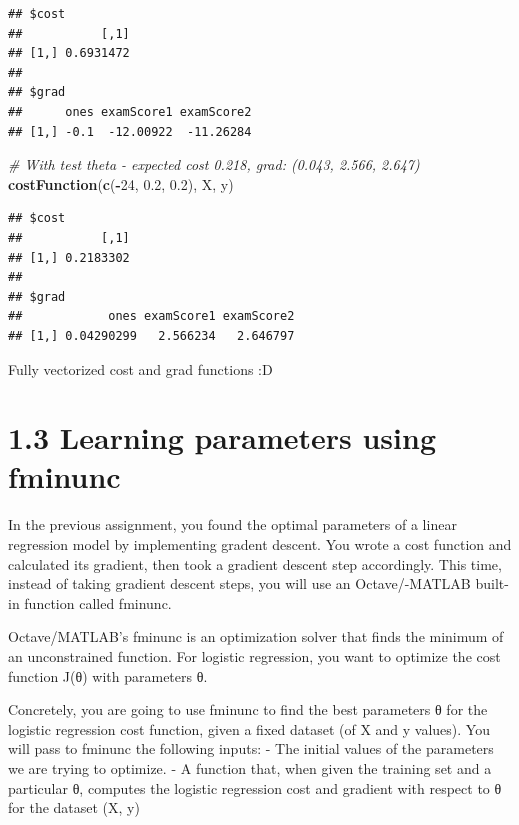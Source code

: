 \documentclass[
]{book}
\newenvironment{Shaded}{\begin{snugshade}}{\end{snugshade}}
\newcommand{\CommentTok}[1]{\textcolor[rgb]{0.56,0.35,0.01}{\textit{#1}}}
\newcommand{\DecValTok}[1]{\textcolor[rgb]{0.00,0.00,0.81}{#1}}
\newcommand{\FloatTok}[1]{\textcolor[rgb]{0.00,0.00,0.81}{#1}}
\newcommand{\KeywordTok}[1]{\textcolor[rgb]{0.13,0.29,0.53}{\textbf{#1}}}
\newcommand{\NormalTok}[1]{#1}
\newcommand{\OperatorTok}[1]{\textcolor[rgb]{0.81,0.36,0.00}{\textbf{#1}}}
\begin{document}
\begin{verbatim}
## $cost
##           [,1]
## [1,] 0.6931472
## 
## $grad
##      ones examScore1 examScore2
## [1,] -0.1  -12.00922  -11.26284
\end{verbatim}

\begin{Shaded}
\begin{Highlighting}[]
\CommentTok{# With test theta - expected cost 0.218, grad: (0.043, 2.566, 2.647)}
\KeywordTok{costFunction}\NormalTok{(}\KeywordTok{c}\NormalTok{(}\OperatorTok{-}\DecValTok{24}\NormalTok{, }\FloatTok{0.2}\NormalTok{, }\FloatTok{0.2}\NormalTok{), X, y)}
\end{Highlighting}
\end{Shaded}

\begin{verbatim}
## $cost
##           [,1]
## [1,] 0.2183302
## 
## $grad
##            ones examScore1 examScore2
## [1,] 0.04290299   2.566234   2.646797
\end{verbatim}

{
Fully vectorized cost and grad functions :D
}

\hypertarget{learning-parameters-using-fminunc}{%
\section{1.3 Learning parameters using fminunc}\label{learning-parameters-using-fminunc}}

In the previous assignment, you found the optimal parameters of a linear regression model by implementing gradent descent. You wrote a cost function and calculated its gradient, then took a gradient descent step accordingly. This time, instead of taking gradient descent steps, you will use an Octave/-MATLAB built-in function called fminunc.

Octave/MATLAB's fminunc is an optimization solver that finds the minimum of an unconstrained function. For logistic regression, you want to optimize the cost function J(θ) with parameters θ.

Concretely, you are going to use fminunc to find the best parameters θ for the logistic regression cost function, given a fixed dataset (of X and y values). You will pass to fminunc the following inputs:
- The initial values of the parameters we are trying to optimize.
- A function that, when given the training set and a particular θ, computes the logistic regression cost and gradient with respect to θ for the dataset (X, y)
\end{document}
